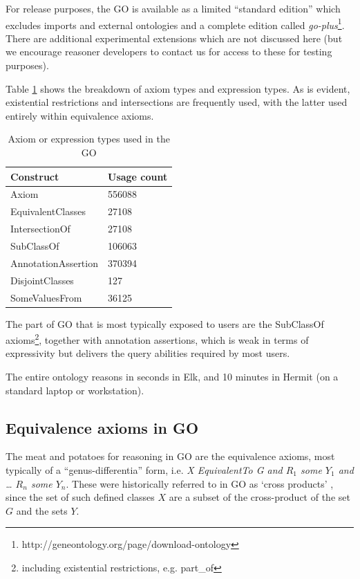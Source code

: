 \documentclass{llncs}
\begin{document}
For release purposes, the GO is available as a limited ``standard
edition'' which excludes imports and external ontologies and a
complete edition called
\emph{go-plus}\footnote{http://geneontology.org/page/download-ontology}. There
are additional experimental extensions which are not discussed here
(but we encourage reasoner developers to contact us for access to
these for testing purposes).

Table \ref{tab:constructs} shows the breakdown of axiom types and
expression types. As is evident, existential restrictions and
intersections are frequently used, with the latter used entirely
within equivalence axioms.

\begin{table}
\begin{tabular}{ | p{4cm} | p{3cm} |  }
\hline
\textbf{Construct} & \textbf{Usage count}  \\
\hline
Axiom & 556088 \\
EquivalentClasses & 27108 \\
IntersectionOf & 27108 \\
SubClassOf & 106063  \\
AnnotationAssertion & 370394 \\
DisjointClasses & 127 \\
SomeValuesFrom & 36125 \\
\hline
\end{tabular}
\caption{Axiom or expression types used in the GO }
\label{tab:constructs}
\end{table}

The part of GO that is most typically exposed to users are the
SubClassOf axioms\footnote{including existential restrictions, e.g. part\_of},
together with annotation assertions, which is weak in terms of
expressivity but delivers the query abilities required by most users.

The entire ontology reasons in seconds in Elk\cite{kazakov2012elk}, and 10
minutes in Hermit (on a standard laptop or workstation).

\subsection{Equivalence axioms in GO}

The meat and potatoes for reasoning in GO are the equivalence axioms,
most typically of a ``genus-differentia'' form, i.e. \emph{X
  EquivalentTo G and $R_1$ some $Y_1$ and … $R_n$ some $Y_n$}. These were
historically referred to in GO as `cross
products' \cite{Mungall2010GOXP}, since the set of such defined classes
$X$ are a subset of the cross-product of the set $G$ and the sets
$Y$.
\end{document}
